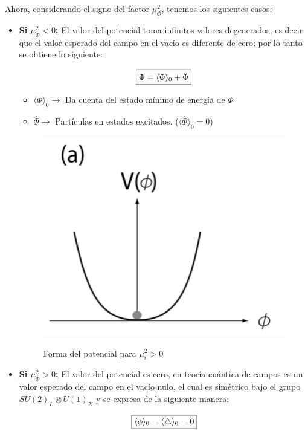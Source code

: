 \documentclass[12pt]{article}
\begin{document}
Ahora, considerando el signo del factor $\mu^2_\Phi$, tenemos los siguientes casos:


\begin{itemize}
    \item\underline{ \textbf{Si \( \mu_\Phi^2<0 \):}} El valor del potencial toma infinitos valores degenerados, es decir que el valor esperado del campo en el vacío es diferente de cero; por lo tanto se obtiene lo siguiente: 
    
\[\fbox{$\Phi=\langle  \Phi \rangle_0 + \hat\Phi$}\]
\begin{itemize}
\item \(\langle  \Phi \rangle_0\rightarrow \)  Da cuenta del estado mínimo de energía de \(\Phi\)
\item \(\hat\Phi \rightarrow \) Partículas en estados excitados. (\(\langle \hat\Phi \rangle_0=0 \))
\end{itemize}

    \begin{figure}[h!]
    \begin{center}
        \includegraphics[scale=0.55]{Potencial Higgs.png}
        \caption\tiny{{Forma del potencial para $\mu_i^2>0$}}  
    \end{center}
\end{figure}


   \item\underline{ \textbf{Si \( \mu_\Phi^2> 0 \):}} El valor del potencial es cero, en teoría cuántica de campos es un valor esperado del campo en el vacío nulo, el cual es simétrico bajo el grupo \(SU(2)_L \otimes U(1)_X\) y se expresa de la siguiente manera: 
    
\[\fbox{$\langle  \phi \rangle_0= \langle  \triangle \rangle_0= 0$}\] 


\end{itemize}
\end{document}
